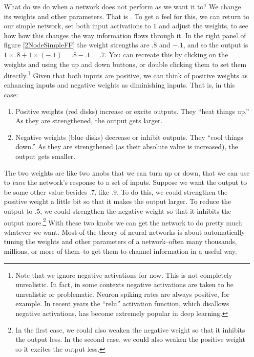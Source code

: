 What do we do when a network does not perform as we want it to? We change its weights and other parameters. That is . To get a feel for this, we can return to our simple network, set both input activations to $1$ and adjust the weights, to see how how this changes the way information flows through it. In the right panel of figure \ref{2NodeSimpleFF} the weight strengths are $.8$ and $-.1$, and so the output is $1 \times .8 + 1 \times (-.1) = .8 - .1 = .7$. You can recreate this by clicking on the weights and using the up and down buttons, or double clicking them to set them directly.\footnote{Note that we ignore negative activations for now. This is not completely unrealistic. In fact, in some contexts negative activations are taken to be unrealistic or problematic. Neuron spiking rates are always positive, for example. In recent years the ``relu'' activation function, which disallows negative activations, has become extremely popular in deep learning.} Given that both inputs are positive, we can think of positive weights as enhancing inputs and negative weights as diminishing inputs. That is, in this case:
\begin{enumerate}
\item  Positive weights (red disks) increase or excite outputs. They ``heat things up.'' As they are strengthened, the output gets larger.
\item  Negative weights (blue disks) decrease or inhibit outputs. They ``cool things down.'' As they are strengthened (as their absolute value is increased), the output gets smaller.
\end{enumerate}
The two weights are like two knobs that we can turn up or down, that we can use to \emph{tune} the network's response to a set of inputs. Suppose we want the output to be some other value besides $.7$, like $.9$. To do this, we could strengthen the positive weight a little bit so that it makes the output larger. To reduce the output to $.5$, we could  strengthen the negative weight so that it inhibits the output more.\footnote{In the first case, we could also weaken the negative weight so that it inhibits the output less. In the second case, we could also weaken the positive weight so it excites the output less.} With these two knobs we can get the network to do pretty much whatever we want.  Most of the theory of neural networks is about automatically tuning the weights and other parameters of a network--often many thousands, millions, or more of them--to get them to channel information in a useful way.


